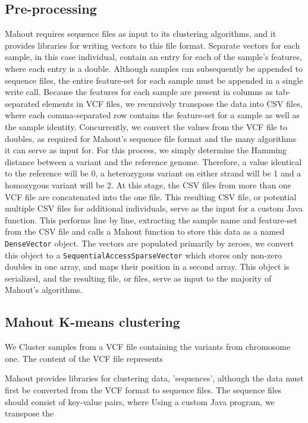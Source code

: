 \documentclass[twocolumn]{bmcart}%
\begin{document}
\subsection*{Pre-processing}
Mahout requires sequence files as input to its clustering algorithms, and it provides libraries for writing vectors to this file format.
Separate vectors for each sample, in this case individual, contain an entry for each of the sample's features, where each entry is
a double. Although samples can subsequently be appended to sequence files, the entire feature-set for each sample must be
appended in a single write call. Because the features for each sample are present in columns as tab-separated elements in VCF
files, we recursively transpose the data into CSV files, where each comma-separated row contains the feature-set for a sample
as well as the sample identity. Concurrently, we convert the values from the VCF file to doubles, as required for Mahout's sequence
file format and the many algorithms it can serve as input for. For this process, we simply determine the Hamming distance between
a variant and the reference genome. Therefore, a value identical to the reference will be 0, a heterozygous variant on either strand
will be 1 and a homozygous variant will be 2.
At this stage, the CSV files from more than one VCF file are concatenated into the one file. This resulting CSV file, or potential multiple
CSV files for additional individuals, serve as the input for a custom Java function. This performs line by line, extracting the sample name
and feature-set from the CSV file and calls a Mahout function to store this data as a named \texttt{DenseVector} object. The vectors are
populated primarily by zeroes,  we convert this object to a \texttt{SequentialAccessSparseVector} which stores only non-zero doubles
in one array, and maps their position in a second array. This object is serialized, and the resulting file, or files, serve as input
to the majority of Mahout's algorithms. 


\subsection*{Mahout K-means clustering}
We Cluster samples from a VCF file containing the variants from chromosome one. The content of the VCF file represents

Mahout provides libraries for clustering data, 'sequences', although the data must first be converted from the VCF format to
sequence files. The sequence files should consist of key-value pairs, where
Using a custom Java program, we transpose the
\end{document}
